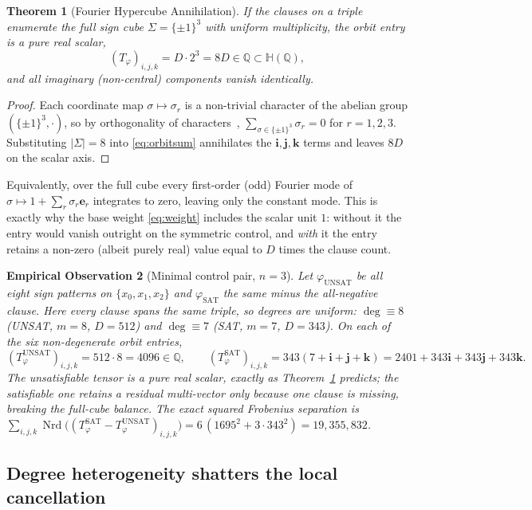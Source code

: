\documentclass[pdflatex,sn-mathphys-num]{sn-jnl}
\theoremstyle{thmstyleone}%
\newtheorem{theorem}{Theorem}%
\theoremstyle{thmstyletwo}%
\newtheorem{observation}[theorem]{Empirical Observation}%
\theoremstyle{thmstylethree}%
\newcommand{\HH}{\mathbb{H}}
\newcommand{\QQ}{\mathbb{Q}}
\newcommand{\Nrd}{\operatorname{Nrd}}
\newcommand{\bi}{\mathbf{i}}
\newcommand{\bj}{\mathbf{j}}
\newcommand{\bk}{\mathbf{k}}
\newcommand{\Tphi}{T_{\varphi}}
\DeclareMathOperator{\deggr}{deg}
\begin{document}
\begin{theorem}[Fourier Hypercube Annihilation]\label{thm:annih}
If the clauses on a triple enumerate the full sign cube
$\Sigma=\{\pm1\}^3$ with uniform multiplicity, the orbit entry is a pure
real scalar,
\[
  (\Tphi)_{i,j,k}=D\cdot2^{3}=8D\in\QQ\subset\HH(\QQ),
\]
and all imaginary (non-central) components vanish identically.
\end{theorem}

\begin{proof}
Each coordinate map $\sigma\mapsto\sigma_r$ is a non-trivial character of
the abelian group $(\{\pm1\}^3,\cdot)$, so by orthogonality of
characters~\cite{ODonnell}, $\sum_{\sigma\in\{\pm1\}^3}\sigma_r=0$ for
$r=1,2,3$. Substituting $|\Sigma|=8$ into \eqref{eq:orbitsum} annihilates
the $\bi,\bj,\bk$ terms and leaves $8D$ on the scalar axis.
\end{proof}

Equivalently, over the full cube every first-order (odd) Fourier mode of
$\sigma\mapsto1+\sum_r\sigma_r\mathbf e_r$ integrates to zero, leaving only
the constant mode. This is exactly why the base weight \eqref{eq:weight}
includes the scalar unit $1$: without it the entry would vanish outright on
the symmetric control, and \emph{with} it the entry retains a non-zero
(albeit purely real) value equal to $D$ times the clause count.

\begin{observation}[Minimal control pair, $n=3$]\label{obs:n3}
Let $\varphi_{\mathrm{UNSAT}}$ be all eight sign patterns on
$\{x_0,x_1,x_2\}$ and $\varphi_{\mathrm{SAT}}$ the same minus the
all-negative clause. Here every clause spans the same triple, so degrees are
uniform: $\deggr\equiv8$ (UNSAT, $m=8$, $D=512$) and $\deggr\equiv7$ (SAT,
$m=7$, $D=343$). On each of the six non-degenerate orbit entries,
\[
  (\Tphi^{\mathrm{UNSAT}})_{i,j,k}=512\cdot8=4096\in\QQ,\qquad
  (\Tphi^{\mathrm{SAT}})_{i,j,k}=343(7+\bi+\bj+\bk)=2401+343\bi+343\bj+343\bk.
\]
The unsatisfiable tensor is a pure real scalar, exactly as
Theorem~\ref{thm:annih} predicts; the satisfiable one retains a residual
multi-vector only because one clause is \emph{missing}, breaking the
full-cube balance. The exact squared Frobenius separation is
$\sum_{i,j,k}\Nrd\big((\Tphi^{\mathrm{SAT}}-\Tphi^{\mathrm{UNSAT}})_{i,j,k}\big)
=6\,(1695^2+3\cdot343^2)=19{,}355{,}832$.
\end{observation}

\subsection{Degree heterogeneity shatters the local cancellation}
\end{document}
